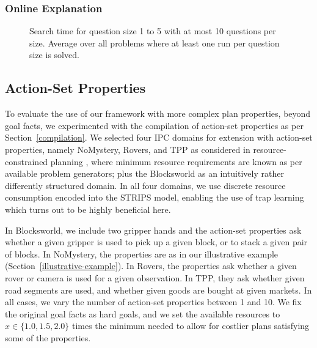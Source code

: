 %

\subsubsection{Online Explanation}

\begin{figure}[ht]

	\caption{
		Search time for question size 1 to 5 with at most 10 questions per size. 
		Average over all problems where at least one run per question size is solved.
	}
\end{figure}






\ifdefined\longflagdefined

\else

\subsection{Action-Set Properties}

To evaluate the use of our framework with more complex plan
properties, beyond goal facts, we experimented with the compilation of
action-set properties as per Section~\ref{compilation}. We selected
four IPC domains for extension with action-set properties, namely
NoMystery, Rovers, and TPP as considered in resource-constrained
planning \cite{nakhost:etal:icaps-12}, where minimum resource
requirements are known as per available problem generators; plus the
Blocksworld as an intuitively rather differently structured domain. In
all four domains, we use discrete resource consumption encoded into
the STRIPS model, enabling the use of trap
learning \cite{steinmetz:hoffmann:ijcai-17} which turns out to be
highly beneficial here.

In Blocksworld, we include two gripper hands and the action-set
properties ask whether a given gripper is used to pick up a given
block, or to stack a given pair of blocks. In NoMystery, the
properties are as in our illustrative example
(Section~\ref{illustrative-example}). In Rovers, the properties ask
whether a given rover or camera is used for a given observation. In
TPP, they ask whether given road segments are used, and whether given
goods are bought at given markets. In all cases, we vary the number of
action-set properties between 1 and 10. We fix the original goal facts
as hard goals, and we set the available resources to $x \in \{1.0,1.5,
2.0\}$ times the minimum needed to allow for costlier plans satisfying
some of the properties.

